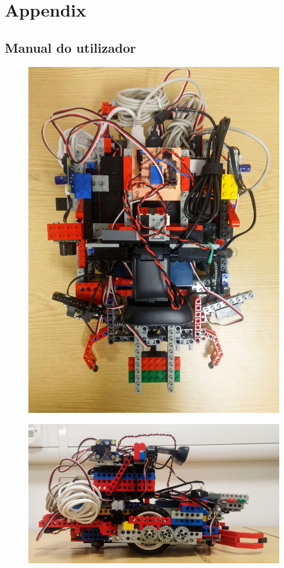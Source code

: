 \appendix

\section{Appendix}


\subsection{Manual do utilizador}

\begin{figure}[ht]
    \centering
    \includegraphics[width=0.7\linewidth]{res/robot-pics/view-top.jpg}
    \caption{}
    \label{fig:}
\end{figure}

\begin{figure}[ht]
    \centering
    \includegraphics[width=0.7\linewidth]{res/robot-pics/view-right-side.jpg}
    \caption{}
    \label{fig:}
\end{figure}

